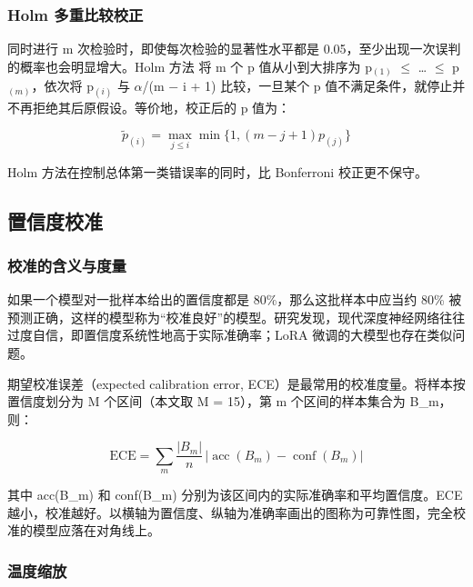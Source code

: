 \subsubsection{Holm 多重比较校正}

同时进行 m 次检验时，即使每次检验的显著性水平都是 0.05，至少出现一次误判的概率也会明显增大。Holm 方法\cite{ref29} 将 m 个 p 值从小到大排序为 p\(_{(1)}\) \(\le\) \ldots{} \(\le\) p\(_{(m)}\)，依次将 p\(_{(i)}\) 与 \(\alpha\)/(m \(-\) i + 1) 比较，一旦某个 p 值不满足条件，就停止并不再拒绝其后原假设。等价地，校正后的 p 值为：

\begin{equation}\tilde p_{(i)}=\max_{j\le i}\min\{1,(m-j+1)p_{(j)}\}\tag{2-11}\label{eq:2-11}\end{equation}

Holm 方法在控制总体第一类错误率的同时，比 Bonferroni 校正更不保守。

\FloatBarrier\subsection{置信度校准}

\subsubsection{校准的含义与度量}

如果一个模型对一批样本给出的置信度都是 80\%，那么这批样本中应当约 80\% 被预测正确，这样的模型称为``校准良好''的模型。研究发现，现代深度神经网络往往过度自信，即置信度系统性地高于实际准确率\cite{ref22}；LoRA 微调的大模型也存在类似问题\cite{ref24}。

期望校准误差（expected calibration error, ECE）是最常用的校准度量。将样本按置信度划分为 M 个区间（本文取 M = 15），第 m 个区间的样本集合为 B\_m，则：

\begin{equation}\mathrm{ECE}=\sum_m\frac{\lvert B_m\rvert}{n}\,\bigl\lvert\operatorname{acc}(B_m)-\operatorname{conf}(B_m)\bigr\rvert\tag{2-12}\label{eq:2-12}\end{equation}

其中 acc(B\_m) 和 conf(B\_m) 分别为该区间内的实际准确率和平均置信度。ECE 越小，校准越好。以横轴为置信度、纵轴为准确率画出的图称为可靠性图，完全校准的模型应落在对角线上。

\subsubsection{温度缩放}

